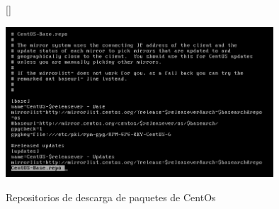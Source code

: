 \documentclass[11pt]{article}
\begin{document}
\begin{figure}[ht]
[\FBwidth]
{\caption{Repositorios de descarga de paquetes de CentOs}\label{fig:repositorios}}
{\includegraphics[width=10cm]{screenshots/httpd-install/repositorios-centos.png}}
\end{figure}
\end{document}
